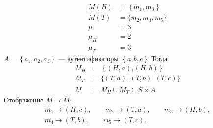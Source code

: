 \begin{example}
  \begin{equation*}
    \begin{split}
      M\left(H\right)&=\left\{{m}_{1},{m}_{3}\right\} \\
      M\left(T\right)&=\{{m}_{2},{m}_{4},{m}_{5}\} \\
      \mu&=3 \\
      {\mu }_{H}&=2 \\
      {\mu }_{T}&=3
    \end{split}
  \end{equation*}
   $A=\left\{{a}_{1},{a}_{2},{a}_{3}\right\}$ --- аутентификаторы
   $\left\{a,b,c\right\}$
  Тогда
  \begin{equation*}
    \begin{split}
      {M}_{H}&=\left\{\left(H,a\right),\left(H,b\right)\right\} \\
      {M}_{T}&=\{\left(T,a\right),\left(T,b\right),(T,c)\} \\
      \overline{M}&={M}_{H} \cup {M}_{T} \subseteq S\times A
    \end{split}
  \end{equation*}
  Отображение $M\rightarrow \overline{M}$:
  \begin{equation*}
    \begin{split}
    {m}_{1}\rightarrow \left(H,a\right),\qquad
    {m}_{2}\rightarrow \left(T,a\right),\qquad
    {m}_{3}\rightarrow \left(H,b\right),\\
    {m}_{4}\rightarrow \left(T,b\right),\qquad
    {m}_{5}\rightarrow \left(T,c\right).
    \end{split}
  \end{equation*}
\end{example}
